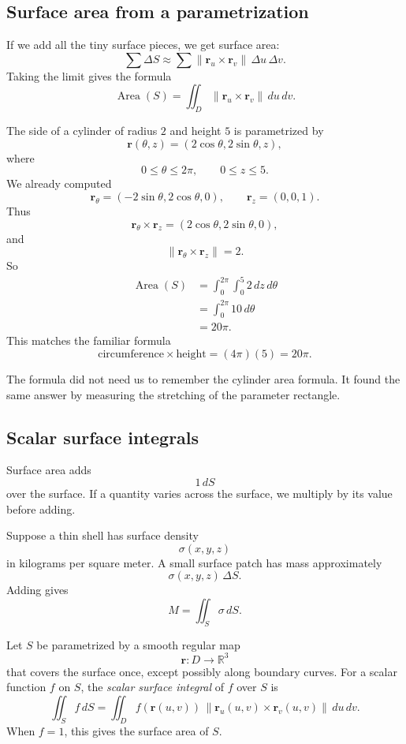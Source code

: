 \subsection{Surface area from a parametrization}

If we add all the tiny surface pieces, we get surface area:
\[
    \sum \Delta S
    \approx
    \sum \|\mathbf r_u\times\mathbf r_v\|\,\Delta u\,\Delta v.
\]
Taking the limit gives the formula
\[
\boxed{
    \operatorname{Area}(S)
    =
    \iint_D \|\mathbf r_u\times\mathbf r_v\|\,du\,dv.
}
\]

\begin{example}
The side of a cylinder of radius \(2\) and height \(5\) is parametrized by
\[
    \mathbf r(\theta,z)=(2\cos\theta,2\sin\theta,z),
\]
where
\[
    0\le\theta\le2\pi,
    \qquad
    0\le z\le5.
\]
We already computed
\[
    \mathbf r_\theta=(-2\sin\theta,2\cos\theta,0),
    \qquad
    \mathbf r_z=(0,0,1).
\]
Thus
\[
    \mathbf r_\theta\times\mathbf r_z
    =
    (2\cos\theta,2\sin\theta,0),
\]
and
\[
    \|\mathbf r_\theta\times\mathbf r_z\|=2.
\]
So
\[
\begin{aligned}
    \operatorname{Area}(S)
    &=
    \int_0^{2\pi}\int_0^5 2\,dz\,d\theta\\
    &=
    \int_0^{2\pi}10\,d\theta\\
    &=
    20\pi.
\end{aligned}
\]
This matches the familiar formula
\[
    \text{circumference}\times\text{height}
    =
    (4\pi)(5)=20\pi.
\]
\end{example}

The formula did not need us to remember the cylinder area formula.  It found the same
answer by measuring the stretching of the parameter rectangle.

\subsection{Scalar surface integrals}

Surface area adds
\[
    1\,dS
\]
over the surface.  If a quantity varies across the surface, we multiply by its value
before adding.

Suppose a thin shell has surface density
\[
    \sigma(x,y,z)
\]
in kilograms per square meter.  A small surface patch has mass approximately
\[
    \sigma(x,y,z)\,\Delta S.
\]
Adding gives
\[
    M=\iint_S \sigma\,dS.
\]

\begin{definition}
Let \(S\) be parametrized by a smooth regular map
\[
    \mathbf r:D\to\mathbb R^3
\]
that covers the surface once, except possibly along boundary curves.  For a scalar
function \(f\) on \(S\), the \emph{scalar surface integral} of \(f\) over \(S\) is
\[
\boxed{
    \iint_S f\,dS
    =
    \iint_D
    f(\mathbf r(u,v))\,
    \|\mathbf r_u(u,v)\times\mathbf r_v(u,v)\|\,
    du\,dv.
}
\]
When \(f=1\), this gives the surface area of \(S\).
\end{definition}

